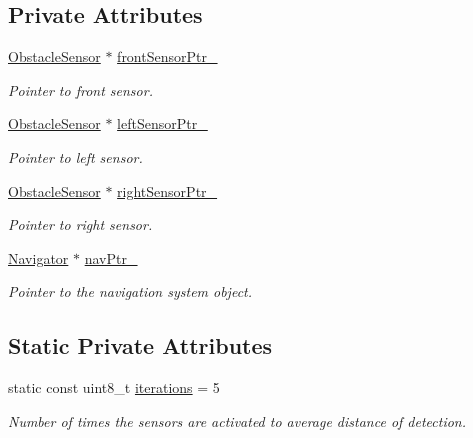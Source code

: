 \subsection*{Private Attributes}
\begin{DoxyCompactItemize}
\item 
\mbox{\hyperlink{class_obstacle_sensor}{Obstacle\+Sensor}} $\ast$ \mbox{\hyperlink{class_obstacle_detection_ab6e8507df02f3b6d9282d0253ac338f3}{front\+Sensor\+Ptr\+\_\+}}
\begin{DoxyCompactList}\small\item\em Pointer to front sensor. \end{DoxyCompactList}\item 
\mbox{\hyperlink{class_obstacle_sensor}{Obstacle\+Sensor}} $\ast$ \mbox{\hyperlink{class_obstacle_detection_a97a24fb4fe1b9d54c2a2bd377426f339}{left\+Sensor\+Ptr\+\_\+}}
\begin{DoxyCompactList}\small\item\em Pointer to left sensor. \end{DoxyCompactList}\item 
\mbox{\hyperlink{class_obstacle_sensor}{Obstacle\+Sensor}} $\ast$ \mbox{\hyperlink{class_obstacle_detection_a25b7aed86ead63e6f71154855cc2d42c}{right\+Sensor\+Ptr\+\_\+}}
\begin{DoxyCompactList}\small\item\em Pointer to right sensor. \end{DoxyCompactList}\item 
\mbox{\hyperlink{class_navigator}{Navigator}} $\ast$ \mbox{\hyperlink{class_obstacle_detection_aa68ee81b360a24f6977480aab44f5650}{nav\+Ptr\+\_\+}}
\begin{DoxyCompactList}\small\item\em Pointer to the navigation system object. \end{DoxyCompactList}\end{DoxyCompactItemize}
\subsection*{Static Private Attributes}
\begin{DoxyCompactItemize}
\item 
static const uint8\+\_\+t \mbox{\hyperlink{class_obstacle_detection_a37811b168a642890429f6752118341cc}{iterations}} = 5
\begin{DoxyCompactList}\small\item\em Number of times the sensors are activated to average distance of detection. \end{DoxyCompactList}\end{DoxyCompactItemize}



